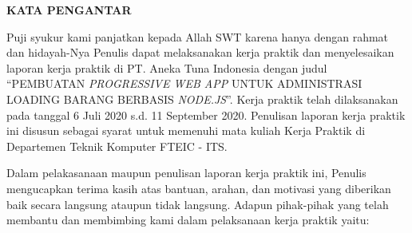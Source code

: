 \begin{center}
  \Large\textbf{KATA PENGANTAR}
\end{center}
\vspace{2ex}


\setlength{\parindent}{7ex}


Puji syukur kami panjatkan kepada Allah SWT karena hanya dengan rahmat dan hidayah-Nya Penulis dapat melaksanakan kerja praktik dan menyelesaikan laporan kerja praktik di PT. Aneka Tuna Indonesia dengan judul “PEMBUATAN \emph{PROGRESSIVE WEB APP} UNTUK ADMINISTRASI LOADING BARANG BERBASIS \emph{NODE.JS}”.
Kerja praktik telah dilaksanakan pada tanggal 6 Juli 2020 s.d. 11 September 2020.
Penulisan laporan kerja praktik ini disusun sebagai syarat untuk memenuhi mata kuliah Kerja Praktik di Departemen Teknik Komputer FTEIC - ITS.
\vspace{0.5ex}

Dalam pelakasanaan maupun penulisan laporan kerja praktik ini, Penulis mengucapkan terima kasih atas bantuan, arahan, dan motivasi yang diberikan baik secara langsung ataupun tidak langsung.
Adapun pihak-pihak yang telah membantu dan membimbing kami dalam pelaksanaan kerja praktik yaitu:
\vspace{0.5ex}

